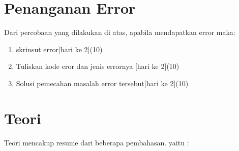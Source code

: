 \section{Penanganan Error}
Dari percobaan yang dilakukan di atas, apabila mendapatkan error maka:

\begin{enumerate}
	\item
	skrinsut error[hari ke 2](10)
	\item
Tuliskan kode eror dan jenis errornya [hari ke 2](10)
	\item
Solusi pemecahan masalah error tersebut[hari ke 2](10)

\end{enumerate}

\section{Teori}
Teori mencakup resume dari beberapa pembahasan. yaitu :
